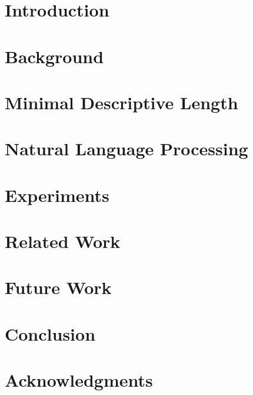 \documentclass[conference]{IEEEtran}
\newcommand{\vidya}[1]{\textcolor{red}{(vidya: #1)}}
\begin{document}


\section{Introduction}


\section{Background}


\section{Minimal Descriptive Length}


\section{Natural Language Processing}


\section{Experiments}


\section{Related Work}


\section{Future Work}


\section{Conclusion}


\section{Acknowledgments}


%

%
%

\end{document}
